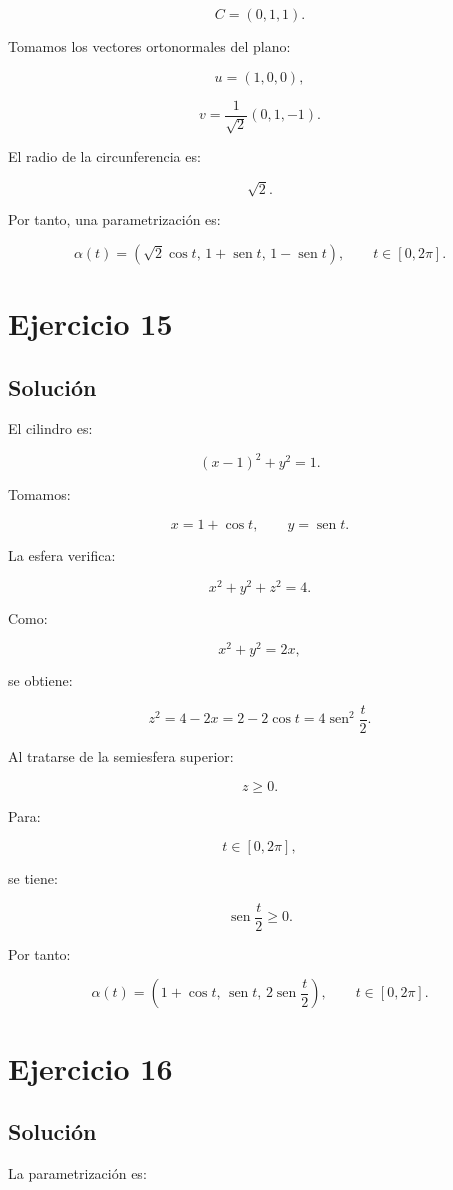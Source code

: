\documentclass[11pt,a4paper]{article}
\newcommand{\sen}{\operatorname{sen}}
\begin{document}
\[
C=(0,1,1).
\]

Tomamos los vectores ortonormales del plano:

\[
u=(1,0,0),
\]

\[
v=
\frac1{\sqrt2}(0,1,-1).
\]

El radio de la circunferencia es:

\[
\sqrt2.
\]

Por tanto, una parametrización es:

\[
\boxed{
\alpha(t)
=
(\sqrt2\cos t,\,
1+\sen t,\,
1-\sen t),
\qquad
t\in[0,2\pi].
}
\]

\section{Ejercicio 15}
\subsection{Solución}

El cilindro es:

\[
(x-1)^2+y^2=1.
\]

Tomamos:

\[
x=1+\cos t,
\qquad
y=\sen t.
\]

La esfera verifica:

\[
x^2+y^2+z^2=4.
\]

Como:

\[
x^2+y^2=2x,
\]

se obtiene:

\[
z^2=4-2x
=
2-2\cos t
=
4\sen^2\frac t2.
\]

Al tratarse de la semiesfera superior:

\[
z\geq0.
\]

Para:

\[
t\in[0,2\pi],
\]

se tiene:

\[
\sen\frac t2\geq0.
\]

Por tanto:

\[
\boxed{
\alpha(t)
=
\left(
1+\cos t,\,
\sen t,\,
2\sen\frac t2
\right),
\qquad
t\in[0,2\pi].
}
\]

\section{Ejercicio 16}
\subsection{Solución}

La parametrización es:
\end{document}

